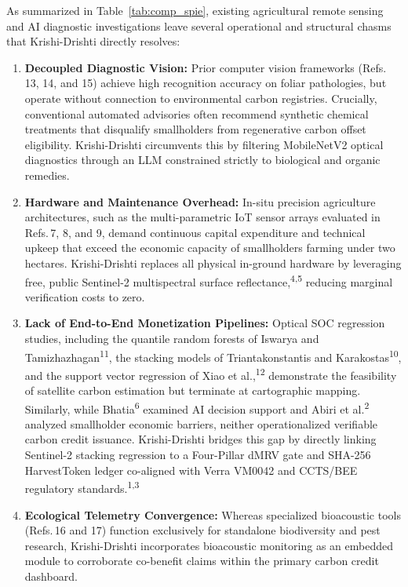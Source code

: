 \documentclass[a4paper,10pt]{article}
\begin{document}
As summarized in Table~\ref{tab:comp_spie}, existing agricultural remote sensing and AI diagnostic investigations leave several operational and structural chasms that Krishi-Drishti directly resolves:
\begin{enumerate}[noitemsep,topsep=2pt]
  \item \textbf{Decoupled Diagnostic Vision:} Prior computer vision frameworks (Refs.\,13, 14, and 15) achieve high recognition accuracy on foliar pathologies, but operate without connection to environmental carbon registries. Crucially, conventional automated advisories often recommend synthetic chemical treatments that disqualify smallholders from regenerative carbon offset eligibility. Krishi-Drishti circumvents this by filtering MobileNetV2 optical diagnostics through an LLM constrained strictly to biological and organic remedies.
  \item \textbf{Hardware and Maintenance Overhead:} In-situ precision agriculture architectures, such as the multi-parametric IoT sensor arrays evaluated in Refs.\,7, 8, and 9, demand continuous capital expenditure and technical upkeep that exceed the economic capacity of smallholders farming under two hectares. Krishi-Drishti replaces all physical in-ground hardware by leveraging free, public Sentinel-2 multispectral surface reflectance,\textsuperscript{4,5} reducing marginal verification costs to zero.
  \item \textbf{Lack of End-to-End Monetization Pipelines:} Optical SOC regression studies, including the quantile random forests of Iswarya and Tamizhazhagan\textsuperscript{11}, the stacking models of Triantakonstantis and Karakostas\textsuperscript{10}, and the support vector regression of Xiao et al.,\textsuperscript{12} demonstrate the feasibility of satellite carbon estimation but terminate at cartographic mapping. Similarly, while Bhatia\textsuperscript{6} examined AI decision support and Abiri et al.\textsuperscript{2} analyzed smallholder economic barriers, neither operationalized verifiable carbon credit issuance. Krishi-Drishti bridges this gap by directly linking Sentinel-2 stacking regression to a Four-Pillar dMRV gate and SHA-256 HarvestToken ledger co-aligned with Verra VM0042 and CCTS/BEE regulatory standards.\textsuperscript{1,3}
  \item \textbf{Ecological Telemetry Convergence:} Whereas specialized bioacoustic tools (Refs.\,16 and 17) function exclusively for standalone biodiversity and pest research, Krishi-Drishti incorporates bioacoustic monitoring as an embedded module to corroborate co-benefit claims within the primary carbon credit dashboard.
\end{enumerate}
\end{document}
